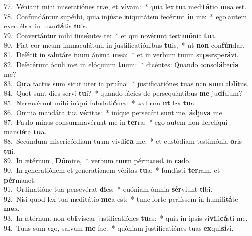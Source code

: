 {77.~}Véniant mihi miseratiónes tuæ, et \textbf{vi}vam:~* quia lex tua medi\textbf{tá}tio \textbf{me}a est.\\
{78.~}Confundántur supérbi, quia injúste iniquitátem fecérunt \textbf{in} me:~* ego autem exercébor in man\textbf{dá}tis \textbf{tu}is.\\
{79.~}Convertántur mihi ti\textbf{mén}tes te:~* et qui novérunt testi\textbf{mó}nia \textbf{tu}a.\\
{80.~}Fiat cor meum immaculátum in justificatiónibus \textbf{tu}is,~* ut \textbf{non} con\textbf{fún}dar.\\
{81.~}Defécit in salutáre tuum ánima \textbf{me}a:~* et in verbum tuum su\textbf{per}spe\textbf{rá}vi.\\
{82.~}Defecérunt óculi mei in elóquium \textbf{tu}um:~* dicéntes: Quando conso\textbf{lá}be\textbf{ris} me?\\
{83.~}Quia factus sum sicut uter in pru\textbf{í}na:~* justificatiónes tuas non \textbf{sum} o\textbf{blí}tus.\\
{84.~}Quot sunt dies servi \textbf{tu}i?~* quando fácies de persequéntibus \textbf{me} ju\textbf{dí}cium?\\
{85.~}Narravérunt mihi iníqui fabulati\textbf{ó}nes:~* sed non \textbf{ut} lex \textbf{tu}a.\\
{86.~}Omnia mandáta tua \textbf{vé}ritas:~* iníque persecúti sunt me, \textbf{ád}ju\textbf{va} me.\\
{87.~}Paulo minus consummavérunt me in \textbf{ter}ra:~* ego autem non derelíqui man\textbf{dá}ta \textbf{tu}a.\\
{88.~}Secúndum misericórdiam tuam vivífi\textbf{ca} me:~* et custódiam testimónia \textbf{o}ris \textbf{tu}i.\\
{89.~}In ætérnum, \textbf{Dó}mine,~* verbum tuum pérma\textbf{net} in \textbf{cæ}lo.\\
{90.~}In generatiónem et generatiónem véritas \textbf{tu}a:~* fundásti \textbf{ter}ram, et \textbf{pér}manet.\\
{91.~}Ordinatióne tua persevérat \textbf{di}es:~* quóniam ómnia \textbf{sér}viunt \textbf{ti}bi.\\
{92.~}Nisi quod lex tua meditátio \textbf{me}a est:~* tunc forte periíssem in humili\textbf{tá}te \textbf{me}a.\\
{93.~}In ætérnum non oblivíscar justificatiónes \textbf{tu}as:~* quia in ipsis vi\textbf{vi}fi\textbf{cá}sti me.\\
{94.~}Tuus sum ego, salvum \textbf{me} fac:~* quóniam justificatiónes tuas \textbf{ex}qui\textbf{sí}vi.\\
